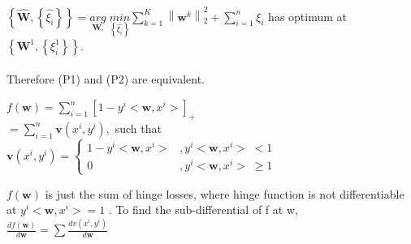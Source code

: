 \documentclass[a4paper,11pt]{article}
\begin{document}
\begin{mlsolution}
\begin{math}
\left \{ \widehat{\textbf{W}}, \left \{ \widehat{\xi _{i}} \right \} \right \} = \underset{\textbf{W},}{arg} \; \underset{ \left \{ \widehat{\xi _{i}} \right \}}{min} \sum_{k=1}^{K} \left \| \textbf{w}^{k} \right \|^{2}_{2} + \sum_{i=1}^{n} \xi _{i}\end{math}  \;has optimum at \begin{math} \left \{ \textbf{W}^{1}, \left \{ \xi _{i}^{1} \right \} \right \} \end{math}.\\\\

Therefore (P1) and (P2) are equivalent.

\end{mlsolution}

\begin{mlsolution}

\begin{math}f \left ( \textbf{w} \right ) = \sum_{i=1}^{n} \left [  1 - y^{i}<\textbf{w}, x^{i}> \right ]_{+}\end{math}\\

\begin{math}
= \sum_{i=1}^{n} \textbf{v}\left ( x^{i}, y^{i} \right ),\end{math} such that \begin{math}\textbf{v}\left ( x^{i}, y^{i} \right ) = \left\{\begin{matrix}
1 - y^{i}<\textbf{w}, x^{i}> &, y^{i}<\textbf{w}, x^{i}> \;<  1\\
0 & , y^{i}<\textbf{w}, x^{i}> \;\geq  1
\end{matrix}\right.
\end{math}

\begin{math}
f\left ( \textbf{w} \right )
\end{math} is just the sum of hinge losses, where hinge function is not differentiable at \begin{math}y^{i}<\textbf{w}, x^{i}> = 1\end{math} . To find the sub-differential of f at w, \\

\begin{math}
\frac{df\left ( \textbf{w} \right )}{d\textbf{w}} = \sum \frac{dv\left ( x^{i}, y^{i} \right )}{d\textbf{w}}
\end{math}\\


\end{mlsolution}
\end{document}
